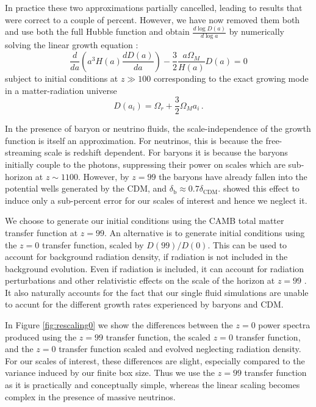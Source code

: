 \documentclass[useAMS, usenatbib]{mnras}
\begin{document}
In practice these two approximations partially cancelled, leading
to results that were correct to a couple of percent. However, we
have now removed them both and use both the full Hubble function
and obtain $\frac{d \log D(a)}{d \log a}$ by numerically solving
the linear growth equation \citep{Peebles:1993}:
\begin{equation}
\frac{d}{da}\left(a^3 H(a) \frac{d D(a)}{da}\right) - \frac{3}{2} \frac{a \Omega_M}{H(a)} D(a) = 0
\end{equation}
subject to initial conditions at $z \gg 100$ corresponding
to the exact growing mode in a matter-radiation universe \citep{Groth:1975}
\begin{equation}
  D(a_i) = \Omega_r + \frac{3}{2} \Omega_M a_i\,.
\end{equation}

In the presence of baryon or neutrino fluids, the scale-independence
of the growth function is itself an approximation. For neutrinos, this
is because the free-streaming scale is redshift dependent. For baryons
it is because the baryons initially couple to the photons, suppressing
their power on scales which are sub-horizon at $z \sim 1100$. However,
by $z=99$ the baryons have already fallen into
the potential wells generated by the CDM,
and $\delta_\mathrm{b} \approx 0.7 \delta_\mathrm{CDM}$.
\cite{Zennaro_2017} showed this effect to induce only
a sub-percent error for our scales of interest and hence we neglect it.

We choose to generate our initial conditions using the CAMB total matter transfer
function at $z=99$. An alternative is to generate initial conditions
using the $z=0$ transfer function, scaled by $D(99)/D(0)$. This can
be used to account for background radiation density, if radiation is not included
in the background evolution. Even if radiation is included, it can account
for radiation perturbations and other relativistic effects on the scale
of the horizon at $z=99$ \citep{Zennaro_2017}. It also naturally accounts
for the fact that our single fluid simulations are unable to accunt for
the different growth rates experienced by baryons and CDM.

In Figure \ref{fig:rescaling0} we show the differences between the $z=0$
power spectra produced using the $z=99$ transfer function, the
scaled $z=0$ transfer function, and the $z=0$ transfer function
scaled and evolved neglecting radiation density.
For our scales of interest, these differences are slight,
especially compared to the variance induced by our finite box size.
Thus we use the $z=99$ transfer function as it is practically and conceptually simple,
whereas the linear scaling becomes complex in the presence of massive neutrinos.
\end{document}
